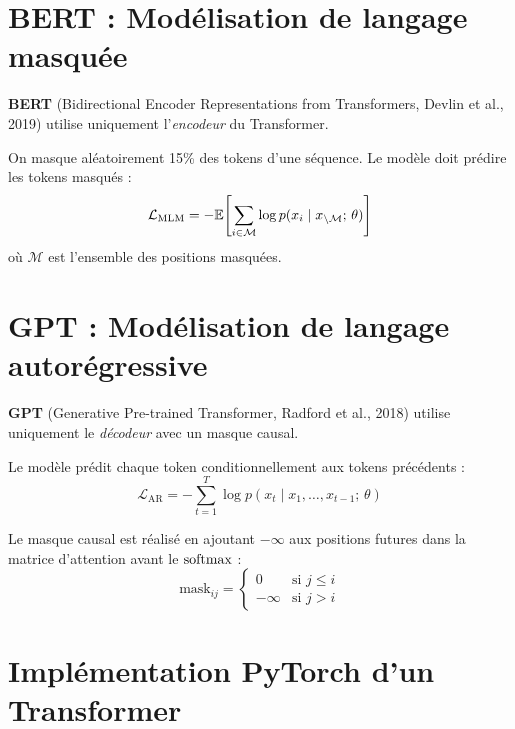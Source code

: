 \section{BERT : Mod\'elisation de langage masqu\'ee}
\label{sec:bert}

\textbf{BERT} (Bidirectional Encoder Representations from Transformers, Devlin et al., 2019) utilise uniquement l'\emph{encodeur} du Transformer.

\begin{definition}
On masque al\'eatoirement 15\% des tokens d'une s\'equence. Le mod\`ele doit pr\'edire les tokens masqu\'es :
\begin{equation}
\mathcal{L}_{\text{MLM}} = -\mathbb{E}\!\left[\sum_{i \in \mathcal{M}} \log p(x_i \mid x_{\setminus \mathcal{M}};\, \theta)\right]
\end{equation}
o\`u $\mathcal{M}$ est l'ensemble des positions masqu\'ees.
\end{definition}

\section{GPT : Mod\'elisation de langage autorégressive}
\label{sec:gpt}

\textbf{GPT} (Generative Pre-trained Transformer, Radford et al., 2018) utilise uniquement le \emph{d\'ecodeur} avec un masque causal.

\begin{definition}
Le mod\`ele pr\'edit chaque token conditionnellement aux tokens pr\'ec\'edents :
\begin{equation}
\mathcal{L}_{\text{AR}} = -\sum_{t=1}^{T} \log p(x_t \mid x_1, \ldots, x_{t-1};\, \theta)
\end{equation}
\end{definition}

Le masque causal est r\'ealis\'e en ajoutant $-\infty$ aux positions futures dans la matrice d'attention avant le $\mathrm{softmax}$ :
\begin{equation}
\text{mask}_{ij} = \begin{cases} 0 & \text{si } j \leq i \\ -\infty & \text{si } j > i \end{cases}
\end{equation}

\section{Impl\'ementation PyTorch d'un Transformer}
\label{sec:transformer-pytorch}

